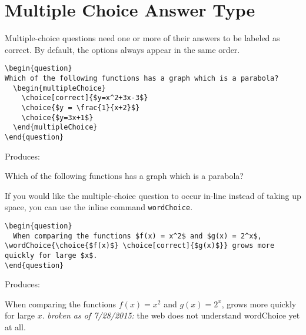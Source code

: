 \documentclass{ximera}
\begin{document}
\section{Multiple Choice Answer Type} \label{MCAnswerType}

\begin{example}
Multiple-choice questions need one or more of their answers to be labeled as correct. By default, the options always appear in the same order.

\begin{verbatim}
\begin{question}
Which of the following functions has a graph which is a parabola?
  \begin{multipleChoice}
    \choice[correct]{$y=x^2+3x-3$}
    \choice{$y = \frac{1}{x+2}$}
    \choice{$y=3x+1$}
  \end{multipleChoice}
\end{question}
\end{verbatim}

Produces:

\begin{question}
  Which of the following functions has a graph which is a parabola?
  \begin{multipleChoice}
  \end{multipleChoice}
\end{question}
\end{example}

\begin{example}
If you would like the multiple-choice question to occur in-line instead of taking up space, you can use the inline command \verb!wordChoice!.
 
\begin{verbatim}
\begin{question}
  When comparing the functions $f(x) = x^2$ and $g(x) = 2^x$, \wordChoice{\choice{$f(x)$} \choice[correct]{$g(x)$}} grows more quickly for large $x$.
\end{question}
\end{verbatim}

Produces:

\begin{question}
  When comparing the functions $f(x) = x^2$ and $g(x) = 2^x$,  grows more quickly for large $x$.
  \emph{broken as of 7/28/2015:} the web does not understand wordChoice yet at all.
\end{question}
\end{example}
\end{document}
